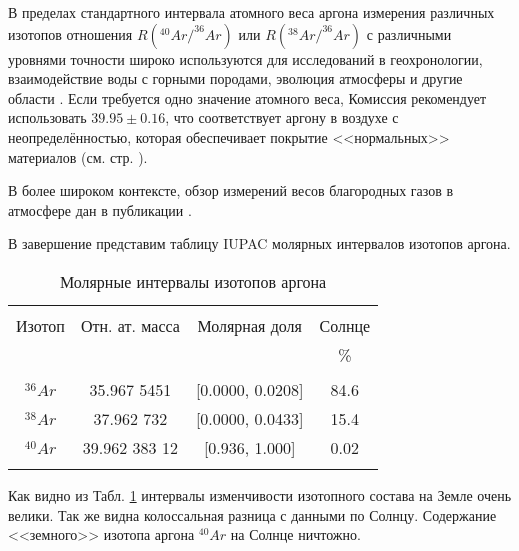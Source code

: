 \documentclass[a5paper,openany]{book}
\begin{document}
В пределах стандартного интервала атомного веса аргона измерения различных изотопов
отношения $R(^{40}Ar/^{36}Ar)$ или $R(^{38}Ar/^{36}Ar)$ с различными уровнями точности широко используются для исследований в геохронологии,
взаимодействие воды с горными породами, эволюция атмосферы и другие области \cite{IUPACArgon}. Если требуется одно значение атомного веса,
Комиссия рекомендует использовать $39.95\pm 0.16$, что соответствует аргону в воздухе с неопределённостью, которая обеспечивает покрытие <<нормальных>> материалов (см. стр. \pageref{NormalSubstance}).

В более широком контексте, обзор измерений весов благородных газов в атмосфере дан в публикации \cite{NobleGasesTracers}.

В завершение представим таблицу IUPAC молярных интервалов изотопов аргона.

\begin{table}[h!]
	\begin{center}
		{\small
			\begin{tabular}{c|cc|c}
				\hline
				& & &   \\
				Изотоп & Отн. ат. масса & Молярная доля &  Солнце \cite{Lodders2003} \\
				& & &  \% \\
				\hline
				& & &  \\ [1mm]
				$^{36}Ar$	& 35.967 5451 & [0.0000, 0.0208] & 84.6 \\
				$^{38}Ar$ 	& 37.962 732 & [0.0000, 0.0433] & 15.4 \\
				$^{40}Ar$   	& 39.962 383 12 & [0.936, 1.000] & 0.02 \\ [1mm]
				& & &   \\
				\hline
			\end{tabular}
		}
		\caption{Молярные интервалы изотопов аргона}
		\label{t:ArIsotopes}
	\end{center}
\end{table}
Как видно из Табл. \ref{t:ArIsotopes} интервалы изменчивости изотопного состава на Земле очень велики. Так же видна колоссальная разница с данными по Солнцу. Содержание <<земного>> изотопа аргона $^{40}Ar$ на Солнце ничтожно.
\end{document}
